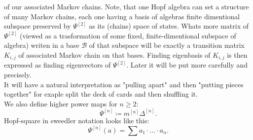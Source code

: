 \documentclass[a4paper, 12pt]{report}
\begin{document}
of our associated Markov chains. Note, that one Hopf algebra can set a structure of many Markov chains,
each one having a basis of algebras finite dimentional subspace preserved by $\Psi^{[2]}$ as its (chains)
space of states.
Whats more matrix of $\Psi^{[2]}$ (viewed as a trasformation of some fixed, finite-dimentional
subspace of algebra)
writen in a base $\mathcal{B}$ of that subspace will be exactly a transition matrix
$K_{i,j}$ of associated Markov chain on that bases. Finding eigenbasis of $K_{i,j}$ is then expressed as
finding eigenvectors of $\Psi^{[2]}$. Later it will be put more carefully and precisely. \\
It will have a natural interpretation as "pulling apart" and then "putting pieces together" for
exaple split the deck of cards and then shuffling it. \\[4pt]
We also define higher power maps for $n \geq 2$:
\begin{equation*}
\Psi^{[n]} \coloneqq m^{[n]}\Delta^{[n]}.
\end{equation*}
Hopf-square in sweedler notation looks like this:
\begin{equation*}
\Psi^{[n]}(a) = \sum a_1 \cdot \ldots \cdot a_n.
\end{equation*}
\end{document}
